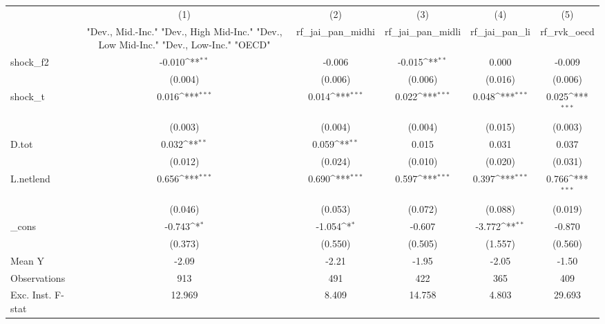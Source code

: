{
\def\sym#1{\ifmmode^{#1}\else\(^{#1}\)\fi}
\begin{tabular}{l*{5}{c}}
\toprule
            &\multicolumn{1}{c}{(1)}&\multicolumn{1}{c}{(2)}&\multicolumn{1}{c}{(3)}&\multicolumn{1}{c}{(4)}&\multicolumn{1}{c}{(5)}\\
            &\multicolumn{1}{c}{ "Dev., Mid.-Inc." "Dev., High Mid-Inc." "Dev., Low Mid-Inc." "Dev., Low-Inc." "OECD" }&\multicolumn{1}{c}{rf\_jai\_pan\_midhi}&\multicolumn{1}{c}{rf\_jai\_pan\_midli}&\multicolumn{1}{c}{rf\_jai\_pan\_li}&\multicolumn{1}{c}{rf\_rvk\_oecd}\\
\midrule
shock\_f2    &      -0.010\sym{**} &      -0.006         &      -0.015\sym{**} &       0.000         &      -0.009         \\
            &     (0.004)         &     (0.006)         &     (0.006)         &     (0.016)         &     (0.006)         \\
\addlinespace
shock\_t     &       0.016\sym{***}&       0.014\sym{***}&       0.022\sym{***}&       0.048\sym{***}&       0.025\sym{***}\\
            &     (0.003)         &     (0.004)         &     (0.004)         &     (0.015)         &     (0.003)         \\
\addlinespace
D.tot       &       0.032\sym{**} &       0.059\sym{**} &       0.015         &       0.031         &       0.037         \\
            &     (0.012)         &     (0.024)         &     (0.010)         &     (0.020)         &     (0.031)         \\
\addlinespace
L.netlend   &       0.656\sym{***}&       0.690\sym{***}&       0.597\sym{***}&       0.397\sym{***}&       0.766\sym{***}\\
            &     (0.046)         &     (0.053)         &     (0.072)         &     (0.088)         &     (0.019)         \\
\addlinespace
\_cons      &      -0.743\sym{*}  &      -1.054\sym{*}  &      -0.607         &      -3.772\sym{**} &      -0.870         \\
            &     (0.373)         &     (0.550)         &     (0.505)         &     (1.557)         &     (0.560)         \\
\midrule
Mean Y      &       -2.09         &       -2.21         &       -1.95         &       -2.05         &       -1.50         \\
Observations&         913         &         491         &         422         &         365         &         409         \\
Exc. Inst. F-stat&      12.969         &       8.409         &      14.758         &       4.803         &      29.693         \\
\bottomrule
\end{tabular}
}
